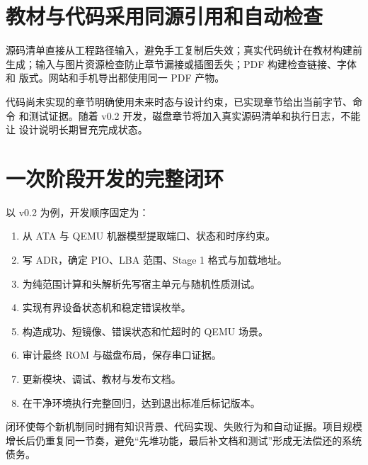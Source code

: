 \section{教材与代码采用同源引用和自动检查}

源码清单直接从工程路径输入，避免手工复制后失效；真实代码统计在教材构建前
生成；输入与图片资源检查防止章节漏接或插图丢失；PDF 构建检查链接、字体和
版式。网站和手机导出都使用同一 PDF 产物。

代码尚未实现的章节明确使用未来时态与设计约束，已实现章节给出当前字节、命令
和测试证据。随着 v0.2 开发，磁盘章节将加入真实源码清单和执行日志，不能让
设计说明长期冒充完成状态。

\section{一次阶段开发的完整闭环}

以 v0.2 为例，开发顺序固定为：

\begin{enumerate}[label=\arabic*.]
  \item 从 ATA 与 QEMU 机器模型提取端口、状态和时序约束。
  \item 写 ADR，确定 PIO、LBA 范围、Stage 1 格式与加载地址。
  \item 为纯范围计算和头解析先写宿主单元与随机性质测试。
  \item 实现有界设备状态机和稳定错误枚举。
  \item 构造成功、短镜像、错误状态和忙超时的 QEMU 场景。
  \item 审计最终 ROM 与磁盘布局，保存串口证据。
  \item 更新模块、调试、教材与发布文档。
  \item 在干净环境执行完整回归，达到退出标准后标记版本。
\end{enumerate}

闭环使每个新机制同时拥有知识背景、代码实现、失败行为和自动证据。项目规模
增长后仍重复同一节奏，避免“先堆功能，最后补文档和测试”形成无法偿还的系统
债务。
